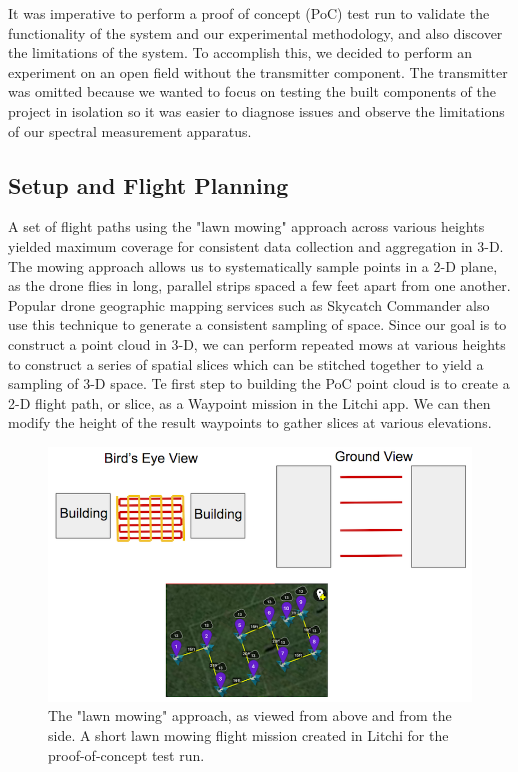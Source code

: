 \documentclass[pageno]{jpaper}
\begin{document}
It was imperative to perform a proof of concept (PoC) test run to validate the functionality of the system and our experimental methodology, and also discover the limitations of the system. To accomplish this, we decided to perform an experiment on an open field without the transmitter component. The transmitter was omitted because we wanted to focus on testing the built components of the project in isolation so it was easier to diagnose issues and observe the limitations of our spectral measurement apparatus. 

\subsection{Setup and Flight Planning}
A set of flight paths using the "lawn mowing" approach across various heights yielded maximum coverage for consistent data collection and aggregation in 3-D. The mowing approach allows us to systematically sample points in a 2-D plane, as the drone flies in long, parallel strips spaced a few feet apart from one another. Popular drone geographic mapping services such as Skycatch Commander also use this technique to generate a consistent sampling of space. Since our goal is to construct a point cloud in 3-D, we can perform repeated mows at various heights to construct a series of spatial slices which can be stitched together to yield a sampling of 3-D space. Te first step to building the PoC point cloud is to create a 2-D flight path, or slice, as a Waypoint mission in the Litchi app. We can then modify the height of the result waypoints to gather slices at various elevations.

\begin{figure}[h]
	\caption{The "lawn mowing" approach, as viewed from above and from the side. A short lawn mowing flight mission created in Litchi for the proof-of-concept test run.}
	\includegraphics{lawn_mow_PoC}
	\centering
\end{figure}
\end{document}
